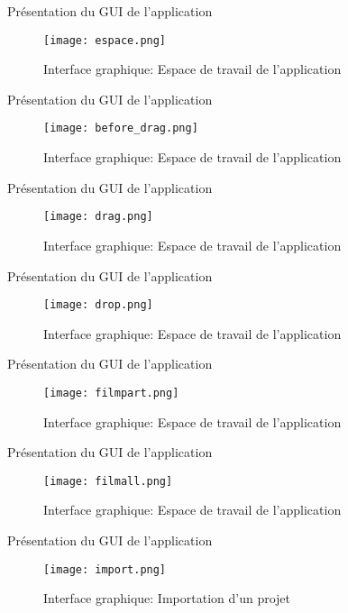 \documentclass[french]{beamer}
\begin{document}
\begin{frame}[fragile]{Présentation du GUI de l’application}
\begin{figure}
 \texttt{[image: espace.png]}
\caption{Interface graphique: Espace de travail de l'application}
\end{figure}
\end{frame}

\begin{frame}[fragile]{Présentation du GUI de l’application}
\begin{figure}
 \texttt{[image: before\_drag.png]}
\caption{Interface graphique: Espace de travail de l'application}
\end{figure}
\end{frame}

\begin{frame}[fragile]{Présentation du GUI de l’application}
\begin{figure}
 \texttt{[image: drag.png]}
\caption{Interface graphique: Espace de travail de l'application}
\end{figure}
\end{frame}

\begin{frame}[fragile]{Présentation du GUI de l’application}
\begin{figure}
 \texttt{[image: drop.png]}
\caption{Interface graphique: Espace de travail de l'application}
\end{figure}
\end{frame}

\begin{frame}[fragile]{Présentation du GUI de l’application}
\begin{figure}
 \texttt{[image: filmpart.png]}
\caption{Interface graphique: Espace de travail de l'application}
\end{figure}
\end{frame}

\begin{frame}[fragile]{Présentation du GUI de l’application}
\begin{figure}
 \texttt{[image: filmall.png]}
\caption{Interface graphique: Espace de travail de l'application}
\end{figure}
\end{frame}


\begin{frame}[fragile]{Présentation du GUI de l’application}
\begin{figure}
 \texttt{[image: import.png]}
\caption{Interface graphique: Importation d'un projet}
\end{figure}
\end{frame}
\end{document}
